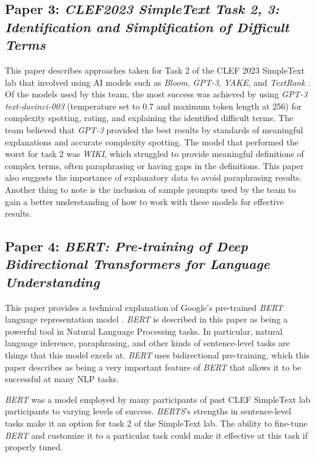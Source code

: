 \documentclass[runningheads]{llncs}
\begin{document}
\subsection{Paper 3: \textit{CLEF2023 SimpleText Task 2, 3: Identification and Simplification of Difficult Terms}}
This paper describes approaches taken for Task 2 of the CLEF 2023 SimpleText lab that involved using AI models such as \textit{Bloom}, \textit{GPT-3}, \textit{YAKE}, and \textit{TextRank} \cite{Paper 3}. Of the models used by this team, the most success was achieved by using \textit{GPT-3 text-davinci-003} (temperature set to 0.7 and maximum token length at 256) for complexity spotting, rating, and explaining the identified difficult terms. The team believed that \textit{GPT-3} provided the best results by standards of meaningful explanations and accurate complexity spotting. The model that performed the worst for task 2 was \textit{WIKI}, which struggled to provide meaningful definitions of complex terms, often paraphrasing or having gaps in the definitions. This paper also suggests the importance of explanatory data to avoid paraphrasing results. Another thing to note is the inclusion of sample prompts used by the team to gain a better understanding of how to work with these models for effective results. 

\subsection{Paper 4: \textit{BERT: Pre-training of Deep Bidirectional Transformers for Language Understanding}}
This paper provides a technical explanation of Google’s pre-trained \textit{BERT} language representation model \cite{Paper 4}. \textit{BERT} is described in this paper as being a powerful tool in Natural Language Processing tasks. In particular, natural language inference, paraphrasing, and other kinds of sentence-level tasks are things that this model excels at. \textit{BERT} uses bidirectional pre-training, which this paper describes as being a very important feature of \textit{BERT} that allows it to be successful at many NLP tasks. 

\textit{BERT} was a model employed by many participants of past CLEF SimpleText lab participants to varying levels of success. \textit{BERTS}'s strengths in sentence-level tasks make it an option for task 2 of the SimpleText lab. The ability to fine-tune \textit{BERT} and customize it to a particular task could make it effective at this task if properly tuned. 
\end{document}
